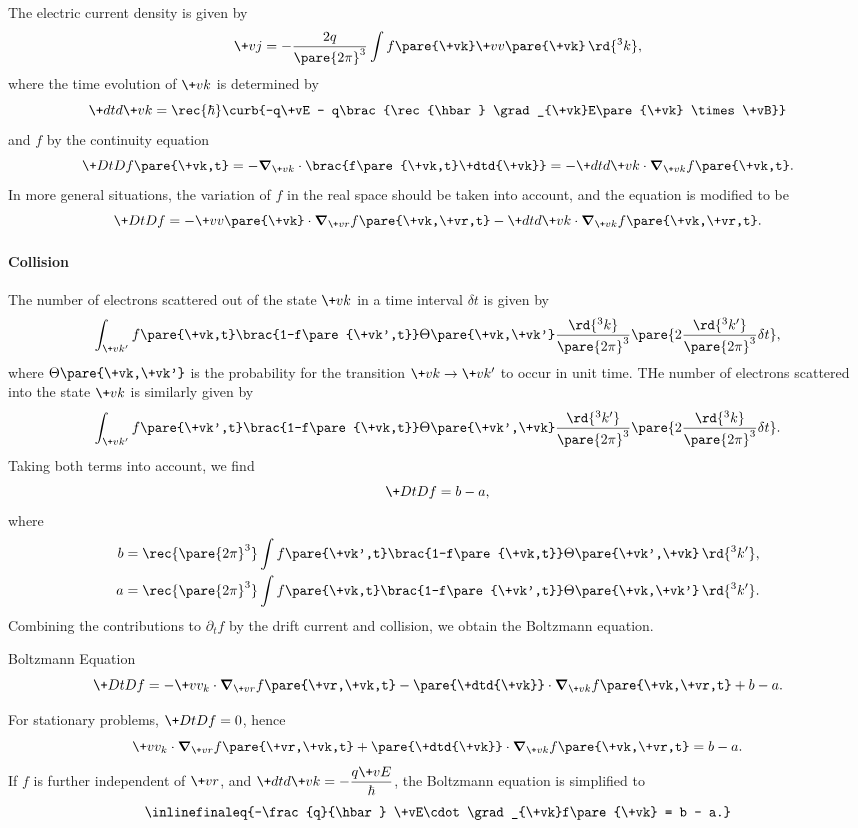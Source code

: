 \documentclass[hidelinks]{article}
\begin{document}
The electric current density is given by
\[ \+vj = -\frac{2q}{\pare{2\pi}^3} \int f\pare{\+vk}\+vv\pare{\+vk}\,\rd{^3k}, \]
where the time evolution of $\+vk$ is determined by
\[ \+dtd{\+vk} = \rec{\hbar}\curb{-q\+vE - q\brac{\rec{\hbar} \grad_{\+vk}E\pare{\+vk} \times \+vB}} \]
and $f$ by the continuity equation
\[ \+DtD{} f\pare{\+vk,t} = -\grad_{\+vk}\cdot \brac{f\pare{\+vk,t}\+dtd{\+vk}} = -\+dtd{\+vk}\cdot \grad_{\+vk}f\pare{\+vk,t}. \]
In more general situations, the variation of $f$ in the real space should be taken into account, and the equation is modified to be
\[ \+DtDf = -\+vv\pare{\+vk}\cdot \grad_{\+vr}f\pare{\+vk,\+vr,t} - \+dtd{\+vk}\cdot \grad_{\+vk}f\pare{\+vk,\+vr,t}. \]


\paragraph{Collision} %
\label{par:collision}

The number of electrons scattered out of the state $\+vk$ in a time interval $\delta t$ is given by
\[ \int_{\+vk'} f\pare{\+vk,t}\brac{1-f\pare{\+vk',t}}\Theta\pare{\+vk,\+vk'}\frac{\rd{^3 k}}{\pare{2\pi}^3}\pare{2\frac{\rd{^3 k'}}{\pare{2\pi}^3}\delta t}, \]
where $\Theta\pare{\+vk,\+vk'}$ is the probability for the transition $\+vk \rightarrow \+vk'$ to occur in unit time.  THe number of electrons scattered into the state $\+vk$ is similarly given by
\[ \int_{\+vk'} f\pare{\+vk',t}\brac{1-f\pare{\+vk,t}}\Theta\pare{\+vk',\+vk}\frac{\rd{^3 k'}}{\pare{2\pi}^3}\pare{2\frac{\rd{^3 k}}{\pare{2\pi}^3} \delta t}. \]
Taking both terms into account, we find
\[ \+DtDf = b-a, \]
where
\begin{align*}
    b &= \rec{\pare{2\pi}^3}\int f\pare{\+vk',t}\brac{1-f\pare{\+vk,t}}\Theta\pare{\+vk',\+vk}\,\rd{^3 k'}, \\
    a &= \rec{\pare{2\pi}^3}\int f\pare{\+vk,t}\brac{1-f\pare{\+vk',t}}\Theta\pare{\+vk,\+vk'}\,\rd{^3 k'}.
\end{align*}
Combining the contributions to $\partial_t f$ by the drift current and collision, we obtain the Boltzmann equation.
\begin{finaleq}{Boltzmann Equation}
    \[ \+DtDf = -\+vv_k\cdot \grad_{\+vr}f\pare{\+vr,\+vk,t} - \pare{\+dtd{\+vk}}\cdot \grad_{\+vk}f\pare{\+vk,\+vr,t} + b - a. \]
\end{finaleq}
For stationary problems, $\displaystyle \+DtDf = 0$, hence
\[ \+vv_k\cdot \grad_{\+vr}f\pare{\+vr,\+vk,t} + \pare{\+dtd{\+vk}}\cdot \grad_{\+vk}f\pare{\+vk,\+vr,t} = b - a. \]
If $f$ is further independent of $\+vr$, and $\displaystyle \+dtd{\+vk} = -\frac{q \+vE}{\hbar}$, the Boltzmann equation is simplified to
\begin{equation}
    \label{eq:boltzmann_eq_simplified}
    \inlinefinaleq{-\frac{q}{\hbar} \+vE\cdot \grad_{\+vk}f\pare{\+vk} = b - a.}
\end{equation}
\end{document}
